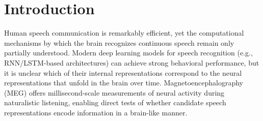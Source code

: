 \documentclass[12pt]{article}
\begin{document}






\section{Introduction}


Human speech communication is remarkably efficient, yet the computational mechanisms by which the brain recognizes continuous speech remain only partially understood. 
Modern deep learning models for speech recognition (e.g., RNN/LSTM-based architectures) can achieve strong behavioral performance, but it is unclear which of their internal representations correspond to the neural representations that unfold in the brain over time. 
Magnetoencephalography (MEG) offers millisecond-scale measurements of neural activity during naturalistic listening, enabling direct tests of whether candidate speech representations encode information in a brain-like manner.
\end{document}

